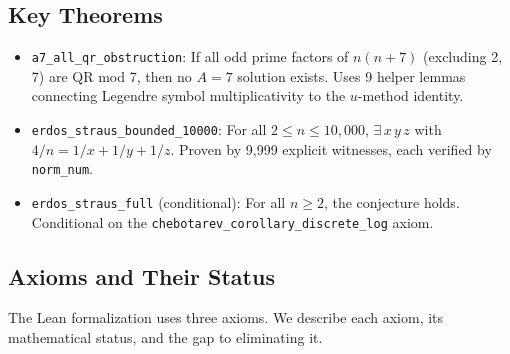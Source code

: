 \documentclass[11pt,a4paper]{article}
\theoremstyle{plain}
\theoremstyle{plain}
\theoremstyle{definition}
\numberwithin{equation}{section}
\begin{document}
\subsection{Key Theorems}

\begin{itemize}[noitemsep]
  \item \texttt{a7\_all\_qr\_obstruction}: If all odd prime factors of $n(n+7)$ (excluding 2, 7) are QR mod 7, then no $A = 7$ solution exists. Uses 9 helper lemmas connecting Legendre symbol multiplicativity to the $u$-method identity.
  \item \texttt{erdos\_straus\_bounded\_10000}: For all $2 \leq n \leq 10{,}000$, $\exists\, x\, y\, z$ with $4/n = 1/x + 1/y + 1/z$. Proven by 9,999 explicit witnesses, each verified by \texttt{norm\_num}.
  \item \texttt{erdos\_straus\_full} (conditional): For all $n \geq 2$, the conjecture holds. Conditional on the \texttt{chebotarev\_corollary\_discrete\_log} axiom.
\end{itemize}

\subsection{Axioms and Their Status}

The Lean formalization uses three axioms. We describe each axiom, its mathematical status, and the gap to eliminating it.
\end{document}
